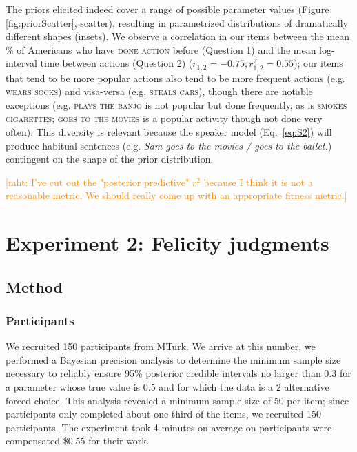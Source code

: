 \documentclass[10pt,letterpaper]{article}
\newcommand{\mht}[1]{\textcolor{DarkOrange}{[mht: #1]}}
\begin{document}
The priors elicited indeed cover a range of possible parameter values (Figure \ref{fig:priorScatter}, scatter), resulting in parametrized distributions of dramatically different shapes (insets).  
We observe a correlation in our items between the mean \% of Americans who have \textsc{done action} before (Question 1) and the mean log-interval time between actions (Question 2) ($r_{1,2} = -0.75; r^2_{1,2} = 0.55$); our items that tend to be more popular actions also tend to be more frequent actions (e.g. \textsc{wears socks}) and visa-versa (e.g. \textsc{steals cars}), though there are notable exceptions (e.g. \textsc{plays the banjo} is not popular but done frequently, as is \textsc{smokes cigarettes}; \textsc{goes to the movies} is a popular activity though not done very often). 
This diversity is relevant because the speaker model (Eq.~\ref{eq:S2}) will produce habitual sentences (e.g. \emph{Sam goes to the movies / goes to the ballet.}) contingent on the shape of the prior distribution. 

\mht{I've cut out the "posterior predictive" $r^2$ because I think it is not a reasonable metric. We should really come up with an appropriate fitness metric.}



\section{Experiment 2: Felicity judgments}

\subsection{Method}

\subsubsection{Participants}

We recruited 150 participants from MTurk.
We arrive at this number, we performed a Bayesian precision analysis to determine the minimum sample size necessary to reliably ensure 95\% posterior credible intervals no larger than 0.3 for a parameter whose true value is 0.5 and for which the data is a 2 alternative forced choice. This analysis revealed a minimum sample size of 50 per item; since participants only completed about one third of the items, we recruited 150 participants.
The experiment took 4 minutes on average on participants were compensated \$0.55 for their work.
\end{document}
